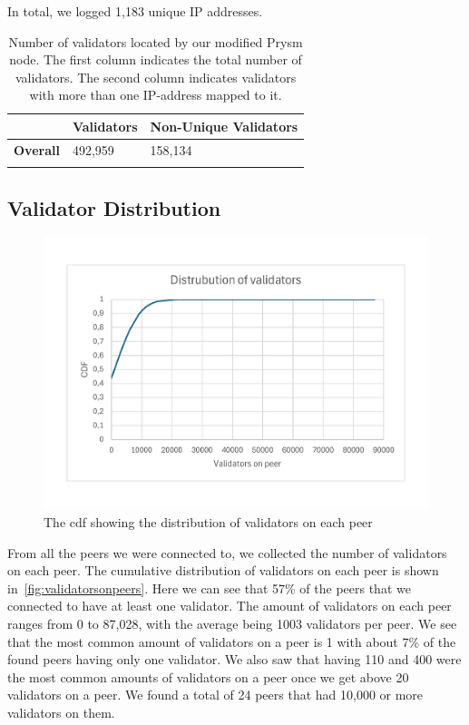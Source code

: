 In total, we logged 1,183 unique IP addresses.


\begin{table}[]
    \centering
    \begin{tabular}{lll}
        \hline
        & \textbf{Validators} & \textbf{Non-Unique Validators} \\ \hline
        \textbf{Overall} & 492,959             & 158,134                        \\ \hline
        \\
    \end{tabular}
    \caption{Number of validators located by our modified Prysm node. The first column indicates the total number of validators. The second column indicates validators with more than one IP-address mapped to it.}
    \label{tab:unique vals}
\end{table}

\subsection{Validator Distribution}\label{subsec:validator-distribution}
\begin{figure}[!ht]
    \centering
    \includegraphics[scale = 0.45]{figures/distval}
    \caption{The cdf showing the distribution of validators on each peer}
    \label{fig:validatorsonpeers}
\end{figure}
From all the peers we were connected to, we collected the number of validators on each peer.
The cumulative distribution of validators on each peer is shown in~\autoref{fig:validatorsonpeers}.
Here we can see that 57\% of the peers that we connected to have at least one validator.
The amount of validators on each peer ranges from 0 to 87,028, with the average being 1003 validators per peer.
We see that the most common amount of validators on a peer is 1 with about 7\% of the found peers having only one validator.
We also saw that having 110 and 400 were the most common amounts of validators on a peer once we get above 20 validators on a peer.
We found a total of 24 peers that had 10,000 or more validators on them.